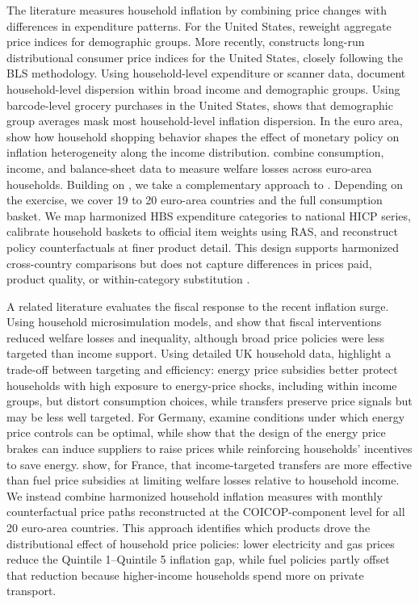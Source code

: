 \documentclass[11pt]{article}
\begin{document}
The literature measures household inflation by combining price changes with differences in
expenditure patterns. For the United States, \citet{hobijn2005inflation} reweight aggregate price indices for demographic groups. More recently, \citet{jaravel2024distributional} constructs long-run distributional
consumer price indices for the United States, closely following the BLS methodology. Using household-level expenditure or scanner data,
\citet{kaplan2017inflation,argente2021cost} document household-level dispersion within broad income and demographic groups.
Using barcode-level grocery purchases in the United States, \citet{oflaherty2026lookwithin} shows that demographic group averages mask most household-level inflation dispersion.
In the euro area, \citet{ampudia2024shopping} show how household
shopping behavior shapes the effect of monetary policy on inflation heterogeneity along the income distribution.
\citet{pallotti2024bears} combine consumption, income, and balance-sheet data to
measure welfare losses across euro-area households. Building on \citet{charalampakis2022impact},
we take a complementary approach to \citet{oflaherty2026lookwithin}. Depending on the exercise, we
cover 19 to 20 euro-area countries and the full consumption basket. We map harmonized HBS expenditure
categories to national HICP series, calibrate household baskets to official item weights using RAS,
and reconstruct policy counterfactuals at finer product detail. This design supports harmonized
cross-country comparisons but does not capture differences in prices paid, product quality, or
within-category substitution \citep{sangani2026cheapflation}.

A related literature evaluates the fiscal response to the recent inflation surge. Using household microsimulation models,
 \citet{pallotti2024bears} and \citet{amores2025inflation} show that fiscal interventions reduced welfare losses and inequality,
although broad price policies were less targeted than income support. Using detailed UK household data,
\citet{levell2026welfare} highlight a trade-off between targeting and efficiency: energy price subsidies
better protect households with high exposure to energy-price shocks, including within income groups, but distort consumption choices,
while transfers preserve price signals but may be less well targeted.
For Germany, \citet{krebs2024pricecontrols} examine conditions under which energy price controls
can be optimal, while \citet{dertwinkelkalt2025energy} show that the design of the energy price brakes
can induce suppliers to raise prices while reinforcing households' incentives to save energy. \citet{bonnet2025compensating} show, for France, that income-targeted transfers are more effective than fuel price subsidies at limiting welfare losses relative to household income.
We instead combine harmonized household inflation measures with monthly counterfactual price paths reconstructed at the
COICOP-component level for all 20 euro-area countries. This approach identifies which products drove the distributional
effect of household price policies: lower electricity and gas prices reduce the Quintile 1--Quintile 5 inflation gap,
while fuel policies partly offset that reduction because higher-income households spend more on private transport.
\end{document}

